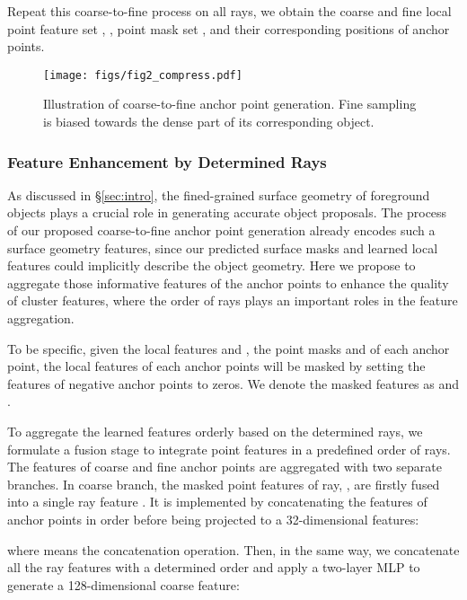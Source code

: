 \documentclass[final]{cvpr}
\begin{document}
Repeat this coarse-to-fine process on all rays, we obtain the coarse and fine local point feature set , , point mask set ,  and their corresponding positions of anchor points.

\begin{figure}[t]
  \centering
   \texttt{[image: figs/fig2\_compress.pdf]}
   \vspace{-10pt}
   \caption{Illustration of coarse-to-fine anchor point generation. Fine sampling is biased towards the dense part of its corresponding object.}
   \label{fig:coarse2fine}
   \vspace{-12pt}
\end{figure}

\vspace{-6pt}
\subsubsection{Feature Enhancement by Determined Rays}\label{sec:feature_enhance}
As discussed in \S \ref{sec:intro}, 
the fined-grained surface geometry of foreground objects plays a crucial role in generating accurate object proposals. 
The process of our proposed coarse-to-fine anchor point generation already encodes such a surface geometry features, since our predicted surface masks and learned local features could implicitly describe the object geometry. 
Here we propose to aggregate those informative features of the anchor points to enhance the quality of cluster features, where the order of rays plays an important roles in the feature aggregation. 

To be specific, given the local features  and ,  the point masks  and  of each anchor point, 
the local features of each anchor points will be masked by setting the features of negative anchor points to zeros. We denote the masked features 
as  and .

To aggregate the learned features orderly based on the determined rays, we formulate a fusion stage to integrate point features in a predefined order of rays. The features of coarse and fine anchor points are aggregated with two separate branches. 
In coarse branch, the masked point features of  ray, , are firstly fused into a single ray feature . It is implemented by concatenating the features of anchor points in order before being projected to a 32-dimensional features:

where  means the concatenation operation. 
Then, in the same way, we concatenate all the ray features  with a determined order and apply a two-layer MLP to generate a 128-dimensional coarse feature: 
\end{document}
